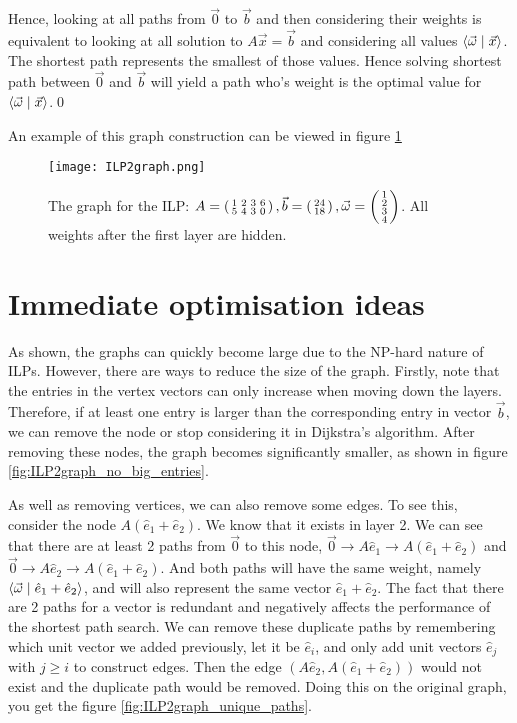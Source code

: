 Hence, looking at all paths from $\vec 0$ to $\vec b$ and then considering their weights is equivalent to looking at all solution to $A\vec x = \vec b$ and considering all values $\langle \vec\omega \mid \vec x \rangle$. The shortest path represents the smallest of those values. Hence solving shortest path between $\vec 0$ and $\vec b$ will yield a path who's weight is the optimal value for $\langle \vec\omega \mid \vec x \rangle$.\qed

An example of this graph construction can be viewed in figure \ref{fig:ILP2graph_no_optimisation}
\begin{figure}
    \texttt{[image: ILP2graph.png]}
    \caption{\label{fig:ILP2graph_no_optimisation}The graph for the ILP: $A = \left(\begin{smallmatrix}1&2&3&6\\5&4&3&0\end{smallmatrix}\right), \vec b = \left(\begin{smallmatrix}24\\18\end{smallmatrix}\right), \vec \omega = \left(\begin{smallmatrix}1\\2\\3\\4\end{smallmatrix}\right)$. All weights after the first layer are hidden.}
\end{figure}

\section{Immediate optimisation ideas}
\label{chap:graph_optimisation}
As shown, the graphs can quickly become large due to the NP-hard nature of ILPs. However, there are ways to reduce the size of the graph. Firstly, note that the entries in the vertex vectors can only increase when moving down the layers. Therefore, if at least one entry is larger than the corresponding entry in vector $\vec b$, we can remove the node or stop considering it in Dijkstra's algorithm. After removing these nodes, the graph becomes significantly smaller, as shown in figure \ref{fig:ILP2graph_no_big_entries}.

As well as removing vertices, we can also remove some edges. To see this, consider the node $A(\hat e_1 + \hat e_2)$. We know that it exists in layer 2. We can see that there are at least 2 paths from $\vec 0$ to this node, $\vec 0 \rightarrow A\hat e_1 \rightarrow A(\hat e_1 + \hat e_2)$ and $\vec 0 \rightarrow A\hat e_2 \rightarrow A(\hat e_1 + \hat e_2)$. And both paths will have the same weight, namely $\langle \vec \omega \mid \hat e_1 + \hat e_2 \rangle$, and will also represent the same vector $\hat e_1 + \hat e_2$. The fact that there are 2 paths for a vector is redundant and negatively affects the performance of the shortest path search. We can remove these duplicate paths by remembering which unit vector we added previously, let it be $\hat e_i$, and only add unit vectors $\hat e_j$ with $j \geq i$ to construct edges. Then the edge $(A\hat e_2, A(\hat e_1 + \hat e_2))$ would not exist and the duplicate path would be removed. Doing this on the original graph, you get the figure \ref{fig:ILP2graph_unique_paths}.

